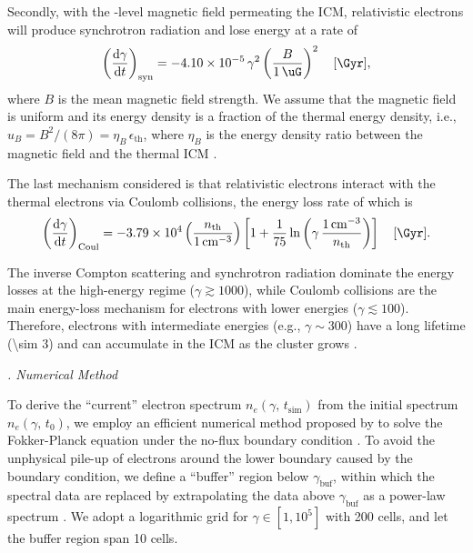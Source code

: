 \documentclass[modern]{aastex62}
\newcommand{\R}[1]{\mathrm{#1}}
\newcommand{\D}[1]{\R{d} #1}
\newcommand{\diff}[2]{\frac{\D{#1}}{\D{#2}}}
\newcounter{sssseccount}
\newcommand{\sssseclabel}{\alph{sssseccount}}
\newcommand{\ssssec}[1]{%
  \vspace{1ex}%
  \stepcounter{sssseccount}%
  \noindent\emph{\sssseclabel. #1}%
}
\begin{document}
Secondly, with the \si{\uG}-level magnetic field permeating the ICM,
relativistic electrons will produce synchrotron radiation and lose
energy at a rate of
\begin{equation}
  \label{eq:eloss-syn}
  \left( \diff{\gamma}{t} \right)_{\R{syn}} =
    \num{-4.10e-5} \,\gamma^2 \left( \frac{B}{\SI{1}{\uG}} \right)^2
    \quad [\si{\per\Gyr}],
\end{equation}
where $B$ is the mean magnetic field strength.
We assume that the magnetic field is uniform and its energy density
is a fraction of the thermal energy density, i.e.,
$u_B = B^2 / (8\pi) = \eta_B \,\epsilon_{\R{th}}$,
where $\eta_B$ is the energy density ratio between the magnetic field
and the thermal ICM \citep[e.g.,][]{bohringer2016}.

The last mechanism considered is that relativistic electrons interact
with the thermal electrons via Coulomb collisions, the energy loss rate
of which is
\begin{equation}
  \label{eq:eloss-coul}
  \left( \diff{\gamma}{t} \right)_{\R{Coul}} =
    \num{-3.79e4} \left( \frac{n_{\R{th}}}{\SI{1}{\per\cm\cubed}} \right)
    \left[ 1 + \frac{1}{75} \ln \left(
        \gamma \,\frac{\SI{1}{\per\cm\cubed}}{n_{\R{th}}} \right) \right]
    \quad [\si{\per\Gyr}].
\end{equation}

The inverse Compton scattering and synchrotron radiation dominate
the energy losses at the high-energy regime ($\gamma \gtrsim 1000$),
while Coulomb collisions are the main energy-loss mechanism for electrons
with lower energies ($\gamma \lesssim 100$).
Therefore, electrons with intermediate energies (e.g., $\gamma \sim 300$)
have a long lifetime (\SI{\sim 3}{\Gyr}) and can accumulate in the ICM
as the cluster grows \citep{sarazin1999}.

\ssssec{Numerical Method}

To derive the \enquote{current} electron spectrum
$n_e(\gamma,\, t_{\R{sim}})$ from the initial spectrum
$n_e(\gamma,\, t_0)$, we employ an efficient numerical method proposed
by \citet{chang1970} to solve the Fokker-Planck equation under the
no-flux boundary condition \citep{park1996}.
To avoid the unphysical pile-up of electrons around the lower boundary
caused by the boundary condition,
we define a \enquote{buffer} region below $\gamma_{\R{buf}}$, within which
the spectral data are replaced by extrapolating the data above
$\gamma_{\R{buf}}$ as a power-law spectrum \citep{donnert2014}.
We adopt a logarithmic grid for $\gamma \in [1, 10^5]$ with 200 cells,
and let the buffer region span 10 cells.
\end{document}
